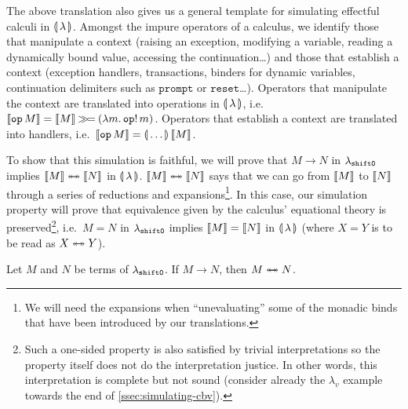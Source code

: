 The above translation also gives us a general template for simulating
effectful calculi in $\llparenthesis \, \lambda \, \rrparenthesis$. Amongst the impure operators of a
calculus, we identify those that manipulate a context (raising an
exception, modifying a variable, reading a dynamically bound value,
accessing the continuation\ldots) and those that establish a context
(exception handlers, transactions, binders for dynamic variables,
continuation delimiters such as $\texttt{prompt}$ or
$\texttt{reset}$\ldots). Operators that manipulate the context are
translated into operations in $\llparenthesis \, \lambda \, \rrparenthesis$,
i.e.\ $\llbracket \texttt{op}\,M \rrbracket = \llbracket M \rrbracket \mathbin{\gg\!=}
(\lambda m.\, \mathtt{op}!\,m)$. Operators that establish a context are
translated into handlers, i.e.\ $\llbracket \texttt{op}\,M \rrbracket =
\llparenthesis \, \ldots \, \rrparenthesis\,\llbracket M \rrbracket$.

To show that this simulation is faithful, we will prove that $M \to N$ in
$\lambda_{\mathtt{shift0}}$ implies $\llbracket M \rrbracket \twoheadleftarrow \mathrel{\mkern-15mu} \twoheadrightarrow \llbracket N \rrbracket$ in
$\llparenthesis \, \lambda \, \rrparenthesis$. $\llbracket M \rrbracket \twoheadleftarrow \mathrel{\mkern-15mu} \twoheadrightarrow \llbracket N \rrbracket$ says that we can go from
$\llbracket M \rrbracket$ to $\llbracket N \rrbracket$ through a series of reductions and
expansions\footnote{We will need the expansions when ``unevaluating'' some
  of the monadic binds that have been introduced by our translations.}. In
this case, our simulation property will prove that equivalence given by the
calculus' equational theory is preserved\footnote{Such a one-sided property
  is also satisfied by trivial interpretations so the property itself does
  not do the interpretation justice. In other words, this interpretation is
  complete but not sound (consider already the $\lambda_v$ example towards
  the end of \ref{ssec:simulating-cbv}). }, i.e.\ $M = N$ in $\lambda_{\mathtt{shift0}}$ implies $\llbracket M \rrbracket
= \llbracket N \rrbracket$ in $\llparenthesis \, \lambda \, \rrparenthesis$ (where $X = Y$ is to be read as $X
\twoheadleftarrow \mathrel{\mkern-15mu} \twoheadrightarrow Y$).

\begin{property}
  Let $M$ and $N$ be terms of $\lambda_{\mathtt{shift0}}$. If $M \to N$, then $M
  \twoheadleftarrow \mathrel{\mkern-15mu} \twoheadrightarrow N$.
\end{property}

